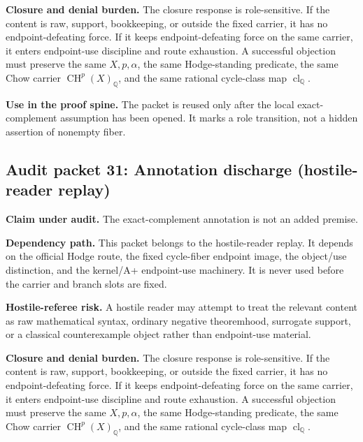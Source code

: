 \documentclass[11pt]{article}
\newcommand{\QQ}{\mathbb{Q}}
\newcommand{\CH}{\operatorname{CH}}
\newcommand{\clQ}{\operatorname{cl}_{\QQ}}
\begin{document}
\par\noindent\textbf{Closure and denial burden.} The closure response is role-sensitive. If the content is raw, support, bookkeeping, or outside the fixed carrier, it has no endpoint-defeating force. If it keeps endpoint-defeating force on the same carrier, it enters endpoint-use discipline and route exhaustion. A successful objection must preserve the same $X,p,\alpha$, the same Hodge-standing predicate, the same Chow carrier $\CH^p(X)_\QQ$, and the same rational cycle-class map $\clQ$.


\par\noindent\textbf{Use in the proof spine.} The packet is reused only after the local exact-complement assumption has been opened. It marks a role transition, not a hidden assertion of nonempty fiber.


\subsection{Audit packet 31: Annotation discharge (hostile-reader replay)}


\par\noindent\textbf{Claim under audit.} The exact-complement annotation is not an added premise.


\par\noindent\textbf{Dependency path.} This packet belongs to the hostile-reader replay. It depends on the official Hodge route, the fixed cycle-fiber endpoint image, the object/use distinction, and the kernel/A+ endpoint-use machinery. It is never used before the carrier and branch slots are fixed.


\par\noindent\textbf{Hostile-referee risk.} A hostile reader may attempt to treat the relevant content as raw mathematical syntax, ordinary negative theoremhood, surrogate support, or a classical counterexample object rather than endpoint-use material.


\par\noindent\textbf{Closure and denial burden.} The closure response is role-sensitive. If the content is raw, support, bookkeeping, or outside the fixed carrier, it has no endpoint-defeating force. If it keeps endpoint-defeating force on the same carrier, it enters endpoint-use discipline and route exhaustion. A successful objection must preserve the same $X,p,\alpha$, the same Hodge-standing predicate, the same Chow carrier $\CH^p(X)_\QQ$, and the same rational cycle-class map $\clQ$.
\end{document}
